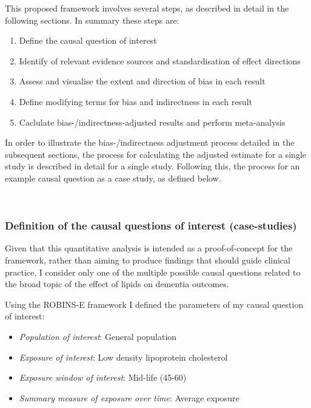 \documentclass[a4paper, twoside]{templates/ociamthesis}
\providecommand{\tightlist}{%
  \setlength{\itemsep}{0pt}\setlength{\parskip}{0pt}}
\begin{document}
This proposed framework involves several steps, as described in detail in the following sections. In summary these steps are:

\begin{enumerate}
\def\labelenumi{\arabic{enumi}.}
\tightlist
\item
  Define the causal question of interest
\item
  Identify of relevant evidence sources and standardisation of effect directions
\item
  Assess and visualise the extent and direction of bias in each result
\item
  Define modifying terms for bias and indirectness in each result
\item
  Caclulate bias-/indirectness-adjusted results and perform meta-analysis
\end{enumerate}

In order to illustrate the bias-/indirectness adjustment process detailed in the subsequent sections, the process for calculating the adjusted estimate for a single study is described in detail for a single study. Following this, the process for an example causal question as a case study, as defined below.

~

\hypertarget{definition-of-the-causal-questions-of-interest-case-studies}{%
\subsubsection{Definition of the causal questions of interest (case-studies)}\label{definition-of-the-causal-questions-of-interest-case-studies}}

Given that this quantitative analysis is intended as a proof-of-concept for the framework, rather than aiming to produce findings that should guide clinical practice, I consider only one of the multiple possible causal questions related to the broad topic of the effect of lipids on dementia outcomes.

Using the ROBINS-E framework I defined the parameters of my causal question of interest:

\begin{itemize}
\tightlist
\item
  \emph{Population of interest}: General population
\item
  \emph{Exposure of interest}: Low density lipoprotein cholesterol
\item
  \emph{Exposure window of interest}: Mid-life (45-60)
\item
  \emph{Summary measure of exposure over time}: Average exposure
\end{itemize}
\end{document}
